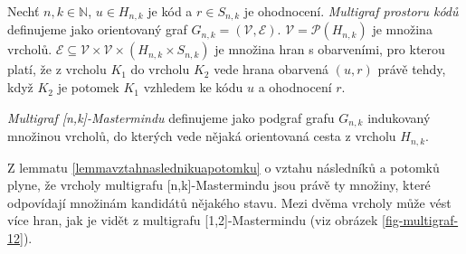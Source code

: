 \begin{definice}
  Nechť $n, k\in \mathbb{N}$, $u\in H_{n,k}$ je kód a $r\in S_{n,k}$ je ohodnocení. \emph{Multigraf prostoru kódů} definujeme jako orientovaný graf $G_{n,k} = (\mathcal{V}, \mathcal{E})$. $\mathcal{V} = \mathcal{P}(H_{n,k})$ je množina vrcholů. $\mathcal{E} \subseteq \mathcal{V} \times \mathcal{V} \times (H_{n,k}\times S_{n,k})$ je množina hran s obarveními, pro kterou platí, že z vrcholu $K_1$ do vrcholu $K_2$ vede hrana obarvená $(u,r)$ právě tehdy, když $K_2$ je potomek $K_1$ vzhledem ke kódu $u$ a ohodnocení $r$. 
\end{definice}


\begin{definice}
  \emph{Multigraf [n,k]-Mastermindu} definujeme jako podgraf grafu $G_{n,k}$ indukovaný množinou vrcholů, do kterých vede nějaká orientovaná cesta z vrcholu $H_{n,k}$. 
  
\end{definice}
Z lemmatu \ref{lemmavztahnaslednikuapotomku} o vztahu následníků a potomků plyne, že vrcholy multigrafu [n,k]-Mastermindu jsou právě ty množiny, které odpovídají množinám kandidátů nějakého stavu. Mezi dvěma vrcholy může vést více hran, jak je vidět z multigrafu [1,2]-Mastermindu (viz obrázek \ref{fig-multigraf-12}).

